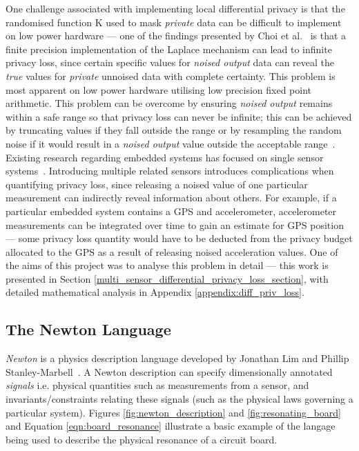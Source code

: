 \documentclass[12pt]{article}
\begin{document}
    One challenge associated with implementing local differential privacy is that the randomised function K used to mask \textit{private} data can be difficult to implement on low power hardware --- one of the findings presented by Choi et al.~\cite{Choi2018GuaranteeingLD} is that a finite precision implementation of the Laplace mechanism can lead to infinite privacy loss, since certain specific values for \textit{noised output} data can reveal the \textit{true} values for \textit{private} unnoised data with complete certainty. This problem is most apparent on low power hardware utilising low precision fixed point arithmetic. This problem can be overcome by ensuring \textit{noised output} remains within a safe range so that privacy loss can never be infinite; this can be achieved by truncating values if they fall outside the range or by resampling the random noise if it would result in a \textit{noised output} value outside the acceptable range~\cite{Choi2018GuaranteeingLD}.\\

    Existing research regarding embedded systems has focused on single sensor systems~\cite{Choi2018GuaranteeingLD}. Introducing multiple related sensors introduces complications when quantifying privacy loss, since releasing a noised value of one particular measurement can indirectly reveal information about others. For example, if a particular embedded system contains a GPS and accelerometer, accelerometer measurements can be integrated over time to gain an estimate for GPS position --- some privacy loss quantity would have to be deducted from the privacy budget allocated to the GPS as a result of releasing noised acceleration values. One of the aims of this project was to analyse this problem in detail --- this work is presented in Section \ref{multi_sensor_differential_privacy_loss_section}, with detailed mathematical analysis in Appendix \ref{appendix:diff_priv_loss}.

  \subsection{The Newton Language}
    \textit{Newton} is a physics description language developed by Jonathan Lim and Phillip Stanley-Marbell~\cite{Newton}. A Newton description can specify dimensionally annotated \textit{signals} i.e. physical quantities such as measurements from a sensor, and invariants/constraints relating these signals (such as the physical laws governing a particular system). Figures \ref{fig:newton_description} and \ref{fig:resonating_board} and Equation \ref{eqn:board_resonance} illustrate a basic example of the langage being used to describe the physical resonance of a circuit board.
\end{document}
